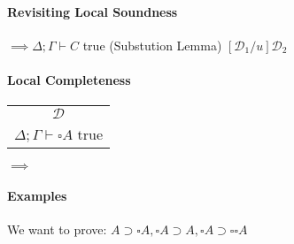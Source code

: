\documentclass[12 pt]{article}
\begin{document}
\paragraph{Revisiting Local Soundness}
\begin{center}
	\noLine
	\noLine
	\DP
	$\implies \Delta; \Gamma \vdash C$ true (Substution Lemma) $[\mathcal{D}_1/u]\mathcal{D_2}$
\end{center}
\paragraph{Local Completeness}
\begin{center}
	\begin{tabular}{c}
		$\mathcal{D}$
		\\ $\Delta; \Gamma \vdash \square A$ true
	\end{tabular}
	$\implies$
	\noLine
	\DP
\end{center}
\paragraph{Examples}
We want to prove: $A \supset \square A, \square A
	\supset A, \square A \supset \square \square A$
\end{document}
